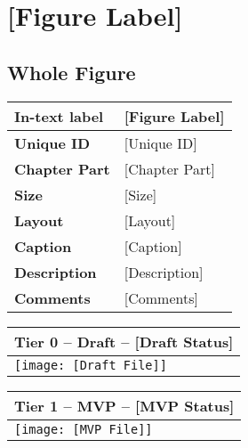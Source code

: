 \clearpage

\section{[Figure Label]} \label{sec_[Figure Label]}

\setcounter{subsection}{-1}

\small

\subsection{Whole Figure}

\begin{table}[h!] %
\centering
\small %
\sffamily %
\begin{tabular}{| m{4cm} | m{10cm} |}
    \hline
    \textbf{In-text label} & [Figure Label] \\
    \hline
    \textbf{Unique ID} & [Unique ID] \\
    \hline
    \textbf{Chapter Part} & [Chapter Part] \\
    \hline
    \textbf{Size} & [Size] \\
    \hline
    \textbf{Layout} & [Layout] \\
    \hline
    \textbf{Caption} & [Caption] \\
    \hline
    \textbf{Description} & [Description] \\
    \hline
    \textbf{Comments} & [Comments] \\
    \hline
    \end{tabular}
\end{table}

\begin{table}[h!] %
\centering
\small %
\sffamily %
\begin{tabular}{| m{14.5cm} |}
    \hline
    \textbf{Tier 0 -- Draft -- [Draft Status]}   \\
    \hline
    \hspace{5pt} \rule{0pt}{10pt} \texttt{[image: [Draft File]]} \rule[-5pt]{0pt}{10pt}\\
    \hline
    \end{tabular}
\end{table}

\begin{table}[h!] %
\centering
\small %
\sffamily %
\begin{tabular}{| m{14.5cm} |}
    \hline
    \textbf{Tier 1 -- MVP -- [MVP Status]} \\
    \hline
    \hspace{5pt} \rule{0pt}{10pt} \texttt{[image: [MVP File]]} \rule[-5pt]{0pt}{10pt}\\
    \hline
    \end{tabular}
\end{table}